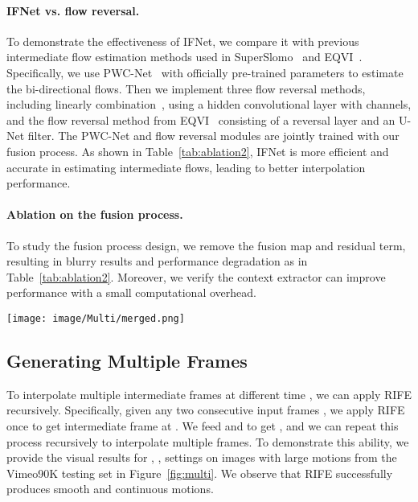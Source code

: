 \documentclass[10pt,twocolumn,letterpaper]{article}
\begin{document}
\paragraph{IFNet vs. flow reversal.}

To demonstrate the effectiveness of IFNet, we compare it with previous intermediate flow estimation methods used in SuperSlomo~\cite{jiang2018super} and EQVI~\cite{liu2020enhanced}. Specifically, we use PWC-Net~\cite{sun2018pwc} with officially pre-trained parameters to estimate the bi-directional flows. Then we implement three flow reversal methods, including linearly combination~\cite{jiang2018super}, using a hidden convolutional layer with  channels, and the flow reversal method from EQVI~\cite{liu2020enhanced} consisting of a reversal layer and an U-Net filter. The PWC-Net and flow reversal modules are jointly trained with our fusion process. As shown in Table~\ref{tab:ablation2}, IFNet is more efficient and accurate in estimating intermediate flows, leading to better interpolation performance. 

\paragraph{Ablation on the fusion process.}
To study the fusion process design, we remove the fusion map and residual term, resulting in blurry results and performance degradation as in Table~\ref{tab:ablation2}. Moreover, we verify the context extractor can improve performance with a small computational overhead.


\begin{figure*}[t]
	\centering\texttt{[image: image/Multi/merged.png]}

	\caption{\textbf{Interpolating multiple frames on the Vimeo90K testing dataset by applying RIFE recursively.} We cut out the moving objects according to the green boxes and zoom in the results. RIFE provides smooth and continuous motions.}\label{fig:multi}
	\vspace{-1em}
\end{figure*}

\subsection{Generating Multiple Frames}
\label{sec:model_multi}
To interpolate multiple intermediate frames at different time , we can apply RIFE recursively. Specifically, given any two consecutive input frames , we apply RIFE once to get intermediate frame  at . We feed  and  to get , and we can repeat this process recursively to  interpolate multiple frames. To demonstrate this ability, we provide the visual results for , ,  settings on images with large motions from the Vimeo90K testing set in Figure~\ref{fig:multi}. We observe that RIFE successfully produces smooth and continuous motions. 
\end{document}
